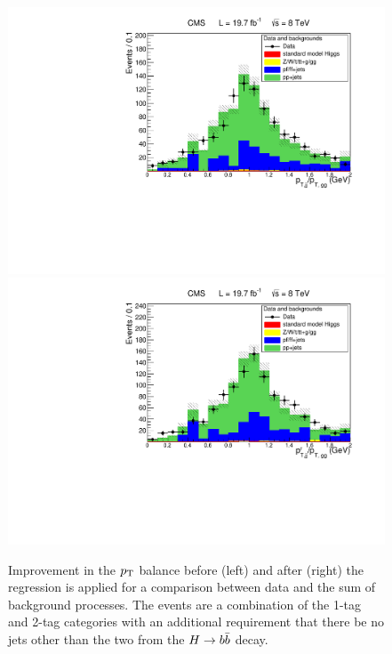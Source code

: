 \begin{figure}[ht]
\begin{center}
\includegraphics[width=.4\textwidth]{figures/objects/pt_balance_datavsmc_before.pdf}
\includegraphics[width=.4\textwidth]{figures/objects/pt_balance_datavsmc_after.pdf}
\end{center}
\caption{Improvement in the $p_{\rm T}$ balance before (left) and after (right) the regression is
applied for a comparison between data and the sum of background processes. The events are a combination
of the 1-tag and 2-tag categories with an additional requirement that there be no jets other than
the two from the $H\to b\bar{b}$ decay.}
\label{fig:regression_validation_datavsmc} 
\end{figure}
